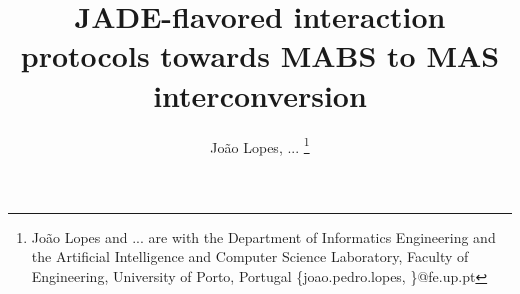 
\title{\LARGE \bf
JADE-flavored interaction protocols towards MABS to MAS interconversion
}


\author{João Lopes, ... %
    \thanks{João Lopes and ... are
    	with the Department of Informatics Engineering and the Artificial
    	Intelligence and Computer Science Laboratory, Faculty of Engineering,
    	University of Porto, Portugal
    	\{joao.pedro.lopes, \}@fe.up.pt } %
}